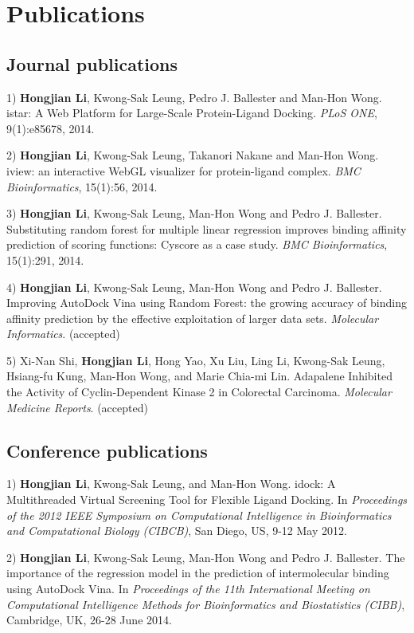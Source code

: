 \chapter{Publications}

\section{Journal publications}

1) \textbf{Hongjian Li}, Kwong-Sak Leung, Pedro J. Ballester and Man-Hon Wong. istar: A Web Platform for Large-Scale Protein-Ligand Docking. \textit{PLoS ONE}, 9(1):e85678, 2014.

2) \textbf{Hongjian Li}, Kwong-Sak Leung, Takanori Nakane and Man-Hon Wong. iview: an interactive WebGL visualizer for protein-ligand complex. \textit{BMC Bioinformatics}, 15(1):56, 2014.

3) \textbf{Hongjian Li}, Kwong-Sak Leung, Man-Hon Wong and Pedro J. Ballester. Substituting random forest for multiple linear regression improves binding affinity prediction of scoring functions: Cyscore as a case study. \textit{BMC Bioinformatics}, 15(1):291, 2014.

4) \textbf{Hongjian Li}, Kwong-Sak Leung, Man-Hon Wong and Pedro J. Ballester. Improving AutoDock Vina using Random Forest: the growing accuracy of binding affinity prediction by the effective exploitation of larger data sets. \textit{Molecular Informatics}. (accepted)

5) Xi-Nan Shi, \textbf{Hongjian Li}, Hong Yao, Xu Liu, Ling Li, Kwong-Sak Leung, Hsiang-fu Kung, Man-Hon Wong, and Marie Chia-mi Lin. Adapalene Inhibited the Activity of Cyclin-Dependent Kinase 2 in Colorectal Carcinoma. \textit{Molecular Medicine Reports}. (accepted)

\section{Conference publications}

1) \textbf{Hongjian Li}, Kwong-Sak Leung, and Man-Hon Wong. idock: A Multithreaded Virtual Screening Tool for Flexible Ligand Docking. In \textit{Proceedings of the 2012 IEEE Symposium on Computational Intelligence in Bioinformatics and Computational Biology (CIBCB)}, San Diego, US, 9-12 May 2012.

2) \textbf{Hongjian Li}, Kwong-Sak Leung, Man-Hon Wong and Pedro J. Ballester. The importance of the regression model in the prediction of intermolecular binding using AutoDock Vina. In \textit{Proceedings of the 11th International Meeting on Computational Intelligence Methods for Bioinformatics and Biostatistics (CIBB)}, Cambridge, UK, 26-28 June 2014.

